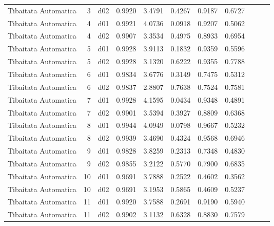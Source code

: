 \begin{landscape}
\begin{longtable}{p{2cm}rrrrrrrrrr}
 Tibaitata Automatica  &          3 &     d02 &   0.9920 &  3.4791 &        0.4267 &           0.9187 &  0.6727 \\
 Tibaitata Automatica  &          4 &     d01 &   0.9921 &  4.0736 &        0.0918 &           0.9207 &  0.5062 \\
 Tibaitata Automatica  &          4 &     d02 &   0.9907 &  3.3534 &        0.4975 &           0.8933 &  0.6954 \\
 Tibaitata Automatica  &          5 &     d01 &   0.9928 &  3.9113 &        0.1832 &           0.9359 &  0.5596 \\
 Tibaitata Automatica  &          5 &     d02 &   0.9928 &  3.1320 &        0.6222 &           0.9355 &  0.7788 \\
 Tibaitata Automatica  &          6 &     d01 &   0.9834 &  3.6776 &        0.3149 &           0.7475 &  0.5312 \\
 Tibaitata Automatica  &          6 &     d02 &   0.9837 &  2.8807 &        0.7638 &           0.7524 &  0.7581 \\
 Tibaitata Automatica  &          7 &     d01 &   0.9928 &  4.1595 &        0.0434 &           0.9348 &  0.4891 \\
 Tibaitata Automatica  &          7 &     d02 &   0.9901 &  3.5394 &        0.3927 &           0.8809 &  0.6368 \\
 Tibaitata Automatica  &          8 &     d01 &   0.9944 &  4.0949 &        0.0798 &           0.9667 &  0.5232 \\
 Tibaitata Automatica  &          8 &     d02 &   0.9939 &  3.4690 &        0.4324 &           0.9568 &  0.6946 \\
 Tibaitata Automatica  &          9 &     d01 &   0.9828 &  3.8259 &        0.2313 &           0.7348 &  0.4830 \\
 Tibaitata Automatica  &          9 &     d02 &   0.9855 &  3.2122 &        0.5770 &           0.7900 &  0.6835 \\
 Tibaitata Automatica  &         10 &     d01 &   0.9691 &  3.7888 &        0.2522 &           0.4602 &  0.3562 \\
 Tibaitata Automatica  &         10 &     d02 &   0.9691 &  3.1953 &        0.5865 &           0.4609 &  0.5237 \\
 Tibaitata Automatica  &         11 &     d01 &   0.9920 &  3.7588 &        0.2691 &           0.9190 &  0.5940 \\
 Tibaitata Automatica  &         11 &     d02 &   0.9902 &  3.1132 &        0.6328 &           0.8830 &  0.7579 \\

\end{longtable}
\end{landscape}
